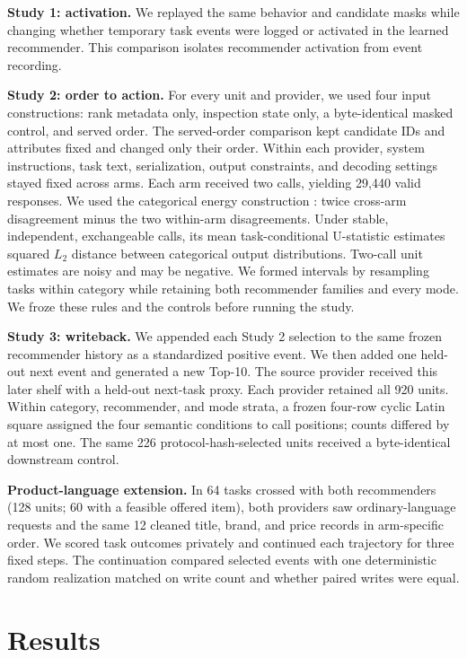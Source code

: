 \documentclass[sigconf]{acmart}
\begin{document}
\textbf{Study 1: activation.} We replayed the same behavior and candidate masks
while changing whether temporary task events were logged or activated in the
learned recommender. This comparison isolates recommender activation from event
recording.

\textbf{Study 2: order to action.} For every unit and provider, we used four
input constructions: rank metadata only, inspection state only, a
byte-identical masked control, and served order. The served-order comparison
kept candidate IDs and attributes fixed and changed only their order. Within
each provider, system instructions, task text, serialization, output constraints,
and decoding settings stayed fixed across arms. Each arm
received two calls, yielding 29,440 valid responses. We used the categorical
energy construction \cite{szekely2013energy}: twice cross-arm disagreement
minus the two within-arm disagreements. Under stable, independent, exchangeable
calls, its mean task-conditional U-statistic estimates squared $L_2$ distance
between categorical output distributions. Two-call unit estimates are noisy
and may be negative. We formed intervals by resampling tasks within category
while retaining both recommender families and every mode. We froze these rules
and the controls before running the study.

\textbf{Study 3: writeback.} We appended each Study 2 selection to the same
frozen recommender history as a standardized positive event. We then added one
held-out next event and generated a new Top-10. The source provider received
this later shelf with a held-out next-task proxy. Each provider retained all
920 units. Within category, recommender, and mode strata,
a frozen four-row cyclic Latin square assigned the four semantic conditions to
call positions; counts differed by at most one. The same 226
protocol-hash-selected units received a byte-identical downstream control.

\textbf{Product-language extension.} In 64 tasks crossed with both recommenders
(128 units; 60 with a feasible offered item), both providers saw
ordinary-language requests and the same 12 cleaned title, brand, and price
records in arm-specific order. We scored task outcomes privately and continued
each trajectory for three fixed steps. The continuation compared selected
events with one deterministic random realization matched on write count and
whether paired writes were equal.

\section{Results}
\end{document}

